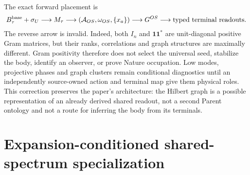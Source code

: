 \documentclass[11pt]{article}
\begin{document}
The exact forward placement is
\begin{equation}
 B_\tau^{\rm base}+\sigma_U
 \longrightarrow M_\tau
 \longrightarrow (\mathcal A_{OS},\omega_{OS},\{x_a\})
 \longrightarrow G^{OS}
 \longrightarrow \hbox{typed terminal readouts}.
 \label{eq:gram-forward-placement}
\end{equation}
The reverse arrow is invalid.  Indeed, both $I_n$ and
$\mathbf1\mathbf1^*$ are unit-diagonal positive Gram matrices, but their
ranks, correlations and graph structures are maximally different.  Gram
positivity therefore does not select the universal seed, stabilize the body,
identify an observer, or prove Nature occupation.  Low modes, projective
phases and graph clusters remain conditional diagnostics until an
independently source-owned action and terminal map give them physical roles.
This correction preserves the paper's architecture: the Hilbert graph is a
possible representation of an already derived shared readout, not a second
Parent ontology and not a route for inferring the body from its terminals.

\section{Expansion-conditioned shared-spectrum specialization}
\end{document}
